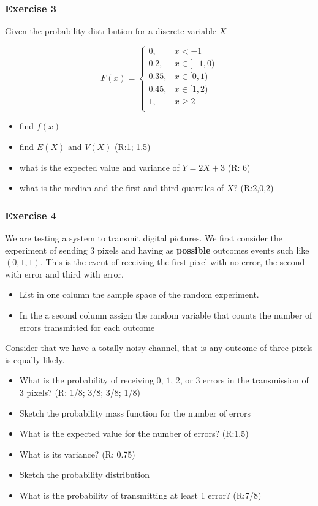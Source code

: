 \documentclass[
]{book}
\providecommand{\tightlist}{%
  \setlength{\itemsep}{0pt}\setlength{\parskip}{0pt}}
\begin{document}
\hypertarget{exercise-3-2}{%
\subsubsection{Exercise 3}\label{exercise-3-2}}

Given the probability distribution for a discrete variable \(X\)

\[
    F(x)= 
\begin{cases}
0, & x < -1 \\
0.2,& x \in [-1,0)\\
0.35,& x \in [0,1)\\
0.45,& x \in [1,2)\\
1,& x \geq 2\\
\end{cases}
\]

\begin{itemize}
\tightlist
\item
  find \(f(x)\)
\item
  find \(E(X)\) and \(V(X)\) (R:1; 1.5)
\item
  what is the expected value and variance of \(Y=2X+3\) (R: 6)
\item
  what is the median and the first and third quartiles of \(X\)? (R:2,0,2)
\end{itemize}

\hypertarget{exercise-4-1}{%
\subsubsection{Exercise 4}\label{exercise-4-1}}

We are testing a system to transmit digital pictures. We first consider the experiment of sending \(3\) pixels and having as \textbf{possible} outcomes events such like \((0,1,1)\). This is the event of receiving the first pixel with no error, the second with error and third with error.

\begin{itemize}
\item
  List in one column the sample space of the random experiment.
\item
  In the a second column assign the random variable that counts the number of errors transmitted for each outcome
\end{itemize}

Consider that we have a totally noisy channel, that is any outcome of three pixels is equally likely.

\begin{itemize}
\item
  What is the probability of receiving \(0\), \(1\), \(2\), or \(3\) errors in the transmission of \(3\) pixels? (R: 1/8; 3/8; 3/8; 1/8)
\item
  Sketch the probability mass function for the number of errors
\item
  What is the expected value for the number of errors? (R:1.5)
\item
  What is its variance? (R: 0.75)
\item
  Sketch the probability distribution
\item
  What is the probability of transmitting at least 1 error? (R:7/8)
\end{itemize}
\end{document}
